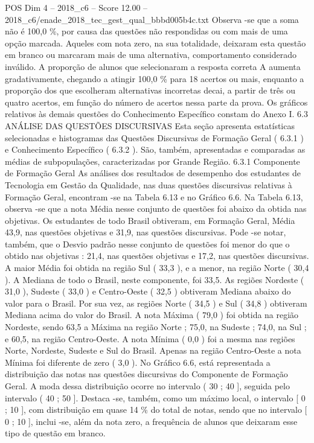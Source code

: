 \begin{textsample}{POS Dim 4 – 2018\_c6 – Score 12.00 – 2018\_c6/enade\_2018\_tec\_gest\_qual\_bbbd005b4c.txt}
Observa -se que a soma não é 100,0 \%, por causa das questões não respondidas ou com mais de uma opção marcada.
Aqueles com nota zero, na sua totalidade, deixaram esta questão em branco ou marcaram mais de uma alternativa, comportamento considerado inválido.
A proporção de alunos que selecionaram a resposta correta A aumenta gradativamente, chegando a atingir 100,0 \% para 18 acertos ou mais, enquanto a proporção dos que escolheram alternativas incorretas decai, a partir de três ou quatro acertos, em função do número de acertos nessa parte da prova.
Os gráficos relativos às demais questões do Conhecimento Específico constam do Anexo I. 6.3 ANÁLISE DAS QUESTÕES DISCURSIVAS Esta seção apresenta estatísticas selecionadas e histogramas das Questões Discursivas de Formação Geral ( 6.3.1 ) e Conhecimento Específico ( 6.3.2 ).
São, também, apresentadas e comparadas as médias de subpopulações, caracterizadas por Grande Região. 6.3.1 Componente de Formação Geral As análises dos resultados de desempenho dos estudantes de Tecnologia em Gestão da Qualidade, nas duas questões discursivas relativas à Formação Geral, encontram -se na Tabela 6.13 e no Gráfico 6.6.
Na Tabela 6.13, observa -se que a nota Média nesse conjunto de questões foi abaixo da obtida nas objetivas.
Os estudantes de todo Brasil obtiveram, em Formação Geral, Média 43,9, nas questões objetivas e 31,9, nas questões discursivas.
Pode -se notar, também, que o Desvio padrão nesse conjunto de questões foi menor do que o obtido nas objetivas : 21,4, nas questões objetivas e 17,2, nas questões discursivas.
A maior Média foi obtida na região Sul ( 33,3 ), e a menor, na região Norte ( 30,4 ).
A Mediana de todo o Brasil, neste componente, foi 33,5.
As regiões Nordeste ( 31,0 ), Sudeste ( 33,0 ) e Centro-Oeste ( 32,5 ) obtiveram Mediana abaixo do valor para o Brasil.
Por sua vez, as regiões Norte ( 34,5 ) e Sul ( 34,8 ) obtiveram Mediana acima do valor do Brasil.
A nota Máxima ( 79,0 ) foi obtida na região Nordeste, sendo 63,5 a Máxima na região Norte ; 75,0, na Sudeste ; 74,0, na Sul ; e 60,5, na região Centro-Oeste.
A nota Mínima ( 0,0 ) foi a mesma nas regiões Norte, Nordeste, Sudeste e Sul do Brasil.
Apenas na região Centro-Oeste a nota Mínima foi diferente de zero ( 3,0 ).
No Gráfico 6.6, está representada a distribuição das notas nas questões discursivas do Componente de Formação Geral.
A moda dessa distribuição ocorre no intervalo ( 30 ; 40 ], seguida pelo intervalo ( 40 ; 50 ].
Destaca -se, também, como um máximo local, o intervalo [ 0 ; 10 ], com distribuição em quase 14 \% do total de notas, sendo que no intervalo [ 0 ; 10 ], inclui -se, além da nota zero, a frequência de alunos que deixaram esse tipo de questão em branco.

\end{textsample}
